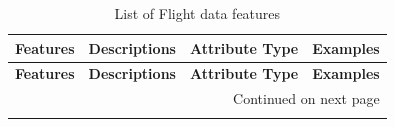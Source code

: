 \documentclass[12pt,oneside]{book} %
\begin{document}
\setlength\LTleft{-1.8cm}
\begin{longtable}{l p{5cm} c >{\centering\arraybackslash}p{4cm} }
\caption{List of Flight data features} \label{tab:flight_data_features} \\

\hline
\textbf{Features} & \textbf{Descriptions} & \textbf{Attribute Type} & \textbf{Examples} \\ \hline
\endfirsthead

\hline
\textbf{Features} & \textbf{Descriptions} & \textbf{Attribute Type} & \textbf{Examples} \\ \hline
\endhead

\hline \multicolumn{4}{r}{{Continued on next page}} \\ \hline
\endfoot

\hline
\endlastfoot


\end{longtable}
\end{document}

